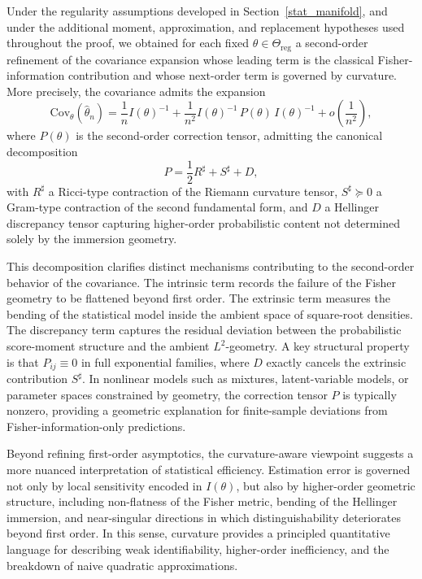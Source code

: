 \documentclass[11pt,letterpaper]{amsart}
\numberwithin{equation}{section}
\theoremstyle{plain}
\theoremstyle{definition}
\theoremstyle{remark}
\begin{document}
Under the regularity assumptions developed in Section~\ref{stat_manifold}, and under the additional moment, approximation, and replacement hypotheses used throughout the proof, we obtained for each fixed \(\theta\in\Theta_{\mathrm{reg}}\) a second-order refinement of the covariance expansion whose leading term is the classical Fisher-information contribution and whose next-order term is governed by curvature. More precisely, the covariance admits the expansion
\[
\mathrm{Cov}_\theta(\hat\theta_n)
=
\frac{1}{n} I(\theta)^{-1}
+
\frac{1}{n^2}
I(\theta)^{-1}
\,P(\theta)\,
I(\theta)^{-1}
+
o\!\left(\frac{1}{n^2}\right),
\]
where \(P(\theta)\) is the second-order correction tensor, admitting the canonical decomposition
\[
P=\frac12 R^\sharp+S^\sharp+D,
\]
with \(R^\sharp\) a Ricci-type contraction of the Riemann curvature tensor, \(S^\sharp\succeq 0\) a Gram-type contraction of the second fundamental form, and \(D\) a Hellinger discrepancy tensor capturing higher-order probabilistic content not determined solely by the immersion geometry.

This decomposition clarifies distinct mechanisms contributing to the second-order behavior of the covariance. The intrinsic term records the failure of the Fisher geometry to be flattened beyond first order. The extrinsic term measures the bending of the statistical model inside the ambient space of square-root densities. The discrepancy term captures the residual deviation between the probabilistic score-moment structure and the ambient \(L^2\)-geometry. A key structural property is that \(P_{ij}\equiv 0\) in full exponential families, where \(D\) exactly cancels the extrinsic contribution \(S^\sharp\). In nonlinear models such as mixtures, latent-variable models, or parameter spaces constrained by geometry, the correction tensor \(P\) is typically nonzero, providing a geometric explanation for finite-sample deviations from Fisher-information-only predictions.

Beyond refining first-order asymptotics, the curvature-aware viewpoint suggests a more nuanced interpretation of statistical efficiency. Estimation error is governed not only by local sensitivity encoded in \(I(\theta)\), but also by higher-order geometric structure, including non-flatness of the Fisher metric, bending of the Hellinger immersion, and near-singular directions in which distinguishability deteriorates beyond first order. In this sense, curvature provides a principled quantitative language for describing weak identifiability, higher-order inefficiency, and the breakdown of naive quadratic approximations.
\end{document}

